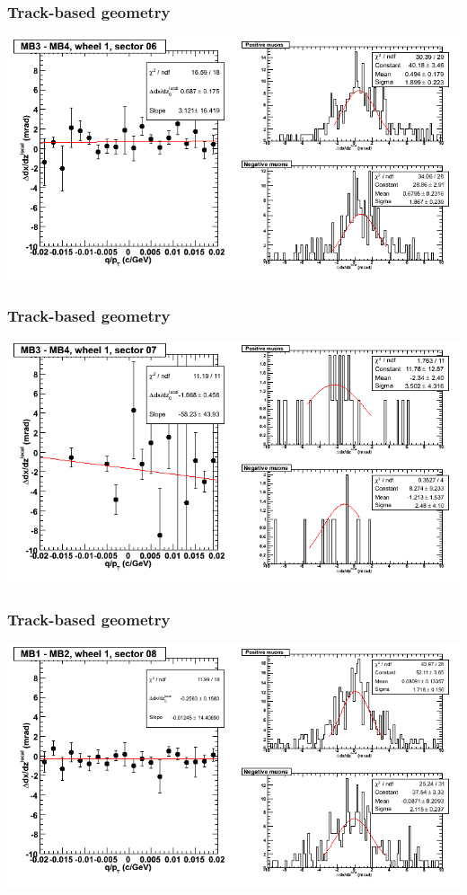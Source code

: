 \documentclass[compress]{beamer}
\begin{document}
\begin{frame}
\frametitle{Track-based geometry}
\includegraphics[width=\linewidth]{NOV4_segdiffs/dt13_slope_D_06_34.png}
\end{frame}

\begin{frame}
\frametitle{Track-based geometry}
\includegraphics[width=\linewidth]{NOV4_segdiffs/dt13_slope_D_07_34.png}
\end{frame}

\begin{frame}
\frametitle{Track-based geometry}
\includegraphics[width=\linewidth]{NOV4_segdiffs/dt13_slope_D_08_12.png}
\end{frame}
\end{document}
